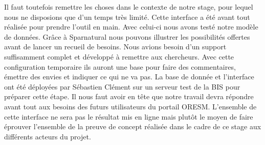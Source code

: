 \par
Il faut toutefois remettre les choses dans le contexte de notre stage, pour lequel nous ne disposions que d'un temps très limité. Cette interface a été avant tout réalisée pour prendre l'outil en main. Avec celui-ci nous avons testé notre modèle de données. Grâce à Sparnatural nous pouvons illustrer les possibilités offertes avant de lancer un recueil de besoins. Nous avions besoin d'un support suffisamment complet et développé à remettre aux chercheurs. Avec cette configuration temporaire ils auront une base pour faire des commentaires, émettre des envies et indiquer ce qui ne va pas. La base de donnée et l'interface ont été déployées par Sébastien Clément sur un serveur test de la BIS pour préparer cette étape. Il nous faut avoir en tête que notre travail devra répondre avant tout aux besoins des futurs utilisateurs du portail ORESM. L'ensemble de cette interface ne sera pas le résultat mis en ligne mais plutôt le moyen de faire éprouver l'ensemble de la preuve de concept réalisée dans le cadre de ce stage aux différents acteurs du projet.